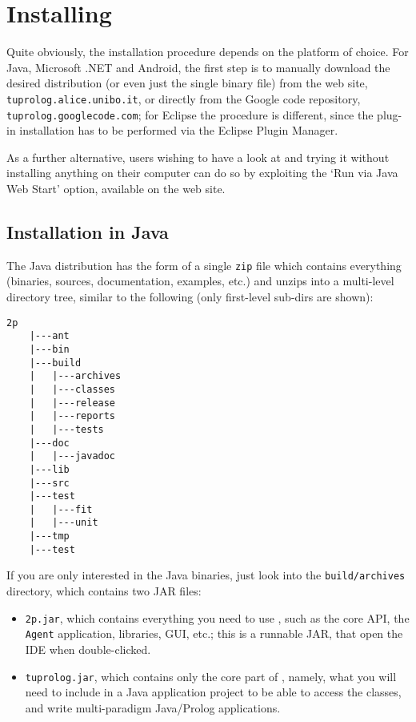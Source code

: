 \chapter{Installing \tuprolog{}}
\label{installation}

Quite obviously, the installation procedure depends on the platform of choice.
For Java, Microsoft .NET and Android, the first step is to manually download the desired distribution (or even just the single binary file) from the \tuprolog{} web site, \texttt{tuprolog.alice.unibo.it}, or directly from the Google code repository, \texttt{tuprolog.googlecode.com}; for Eclipse the procedure is different, since the plug-in installation has to be performed via the Eclipse Plugin Manager.

As a further alternative, users wishing to have a look at \tuprolog{} and trying it without installing anything on their computer can do so by exploiting the `Run via Java Web Start' option, available on the \tuprolog{} web site.

\section{Installation in Java}

The Java distribution has the form of a single \texttt{zip} file which contains everything (binaries, sources, documentation, examples, etc.) and unzips into a multi-level directory tree, similar to the following (only first-level sub-dirs are shown):

\begin{Verbatim}[frame=single, framerule=0.5mm, samepage=true, boxwidth=5cm]
    2p
    |---ant
    |---bin
    |---build
    |   |---archives
    |   |---classes
    |   |---release
    |   |---reports
    |   |---tests
    |---doc
    |   |---javadoc
    |---lib
    |---src
    |---test
    |   |---fit
    |   |---unit
    |---tmp
    |---test
\end{Verbatim}

%
If you are only interested in the Java binaries, just look into the \texttt{build/archives} directory, which contains two JAR files:
%
\begin{itemize}
%
\item \texttt{2p.jar}, which contains everything you need to use \tuprolog{},
  such as the core API, the \texttt{Agent} application, libraries, GUI,
  etc.; this is a runnable JAR, that open the \tuprolog{} IDE when double-clicked.
%
\item \texttt{tuprolog.jar}, which contains only the core part of \tuprolog{},
  namely, what you will need to include in a Java application project to be able to access the \tuprolog{} classes, and write multi-paradigm Java/Prolog applications.
\end{itemize}

